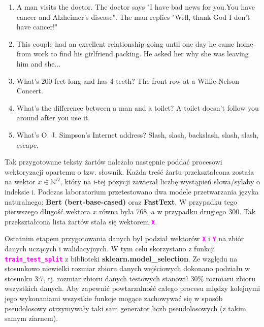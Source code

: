 \documentclass{article}
\newcommand{\code}[1]{\textcolor{Fuchsia}{\textbf{\texttt{#1}}}}
\begin{document}
    \begin{enumerate}
        \item A man visits the doctor. The doctor says "I have bad news for you.You have cancer and Alzheimer's disease". The man replies "Well, thank God I don't have cancer!"
        \item This couple had an excellent relationship going until one day he came home from work to find his girlfriend packing. He asked her why she was leaving him and she...
        \item What's 200 feet long and has 4 teeth?  The front row at a Willie Nelson Concert.
        \item What's the difference between a man and a toilet?  A toilet doesn't follow you around after you use it.
        \item What's O. J. Simpson's Internet address?  Slash, slash, backslash, slash, slash, escape.
    \end{enumerate}

\noindent Tak przygotowane teksty żartów należało następnie poddać procesowi wektoryzacji opartemu o tzw. słownik. Każda treść żartu przekształcona została na wektor $x \in \mathbb{N}^{D}$, który na i-tej pozycji zawierał liczbę wystąpień słowa/sylaby o indeksie i. Podczas laboratorium przetestowano dwa modele przetwarzania języka naturalnego: \textbf{Bert (bert-base-cased)} oraz \textbf{FastText}. W przypadku tego pierwszego długość wektora $x$ równa była 768, a w przypadku drugiego 300. Tak przekształcona lista żartów stała się wektorem \code{X}.

\vspace{0.2cm}

\noindent Ostatnim etapem przygotowania danych był podział wektorów \code{X} i \code{Y} na zbiór danych uczących i walidacyjnych. W tym celu skorzystano z funkcji \code{train\_test\_split} z biblioteki \textbf{sklearn.model\_selection}. Ze względu na stosunkowo niewielki rozmiar zbioru danych wejściowych dokonano podziału w stosunku 3:7, tj. rozmiar zbioru danych testowych stanowił 30\% rozmiaru zbioru wszystkich danych. Aby zapewnić powtarzalność całego procesu między kolejnymi jego wykonaniami wszystkie funkcje mogące zachowywać się w sposób pseudolosowy otrzymywały taki sam generator liczb pseudolosowych (z takim samym ziarnem).
\end{document}
